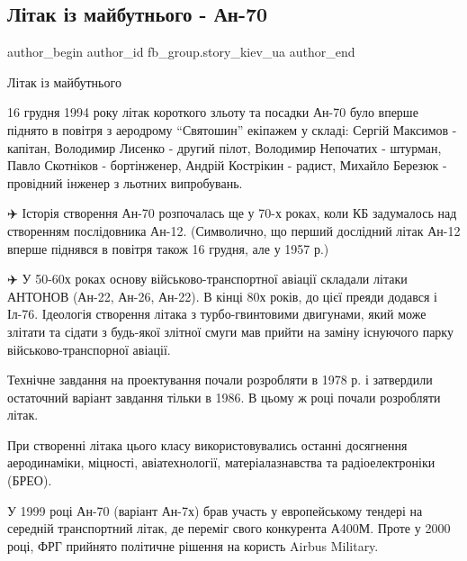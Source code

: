  
 
 
 
 
 
\subsection{Літак із майбутнього - Ан-70}
\label{sec:16_11_2021.fb.fb_group.story_kiev_ua.2.an70}
 
\ifcmt
 author_begin
   author_id fb_group.story_kiev_ua
 author_end
\fi

Літак із майбутнього

16 грудня 1994 року літак короткого зльоту та посадки Ан-70 було вперше піднято
в повітря з аеродрому \enquote{Святошин} екіпажем у складі: Сергій Максимов - капітан,
Володимир Лисенко - другий пілот, Володимир Непочатих - штурман, Павло
Скотніков - бортінженер, Андрій Кострікин - радист, Михайло Березюк - провідний
інженер з льотних випробувань.

✈️ Історія створення Ан-70 розпочалась ще у 70-х роках, коли КБ задумалось над
створенням послідовника Ан-12. (Символично, що перший дослідний літак Ан-12
вперше піднявся в повітря також 16 грудня, але у 1957 р.)

✈️   У 50-60х роках основу військово-транспортної авіації складали літаки
АНТОНОВ (Ан-22, Ан-26, Ан-22). В кінці 80х років, до цієї преяди додався і
Іл-76. Ідеологія  створення літака з турбо-гвинтовими двигунами, який може
злітати та сідати з будь-якої злітної смуги мав прийти на заміну існуючого
парку військово-транспорної авіації.

Технічне завдання на проектування почали розробляти в 1978 р. і затвердили
остаточний варіант завдання тільки в 1986. В цьому ж році почали розробляти
літак.

При створенні літака цього класу використовувались останні досягнення
аеродинаміки, міцності, авіатехнології, матеріалазнавства та радіоелектроніки
(БРЕО). 

У 1999 році Ан-70 (варіант Ан-7х) брав участь у европейському тендері на
середній транспортний літак, де переміг свого конкурента А400М. Проте у 2000
році, ФРГ прийнято політичне рішення на користь Airbus Military. 

